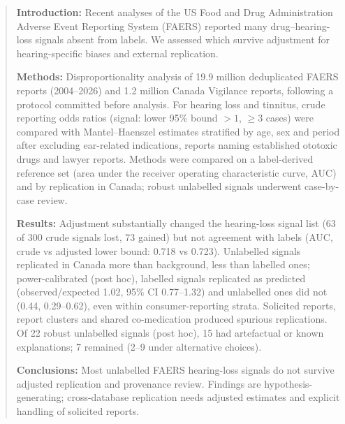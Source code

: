 \begin{abstract}
\noindent\textbf{Introduction:} Recent analyses of the US Food and Drug Administration Adverse Event
Reporting System (FAERS) reported many drug--hearing-loss signals absent from labels. We assessed which survive adjustment for
hearing-specific biases and external replication.

\noindent\textbf{Methods:} Disproportionality analysis of 19.9 million deduplicated FAERS reports
(2004--2026) and 1.2 million Canada Vigilance reports, following a protocol committed before
analysis. For hearing loss and tinnitus, crude reporting odds ratios (signal: lower 95\% bound $>1$, $\geq$3 cases) were
compared with Mantel--Haenszel estimates stratified by age, sex and period after excluding ear-related indications, reports
naming established ototoxic drugs and lawyer reports. Methods were compared on a label-derived reference set (area under the
receiver operating characteristic curve, AUC) and by replication in Canada; robust unlabelled signals underwent
case-by-case review.

\noindent\textbf{Results:} Adjustment substantially changed the hearing-loss signal list
(63 of 300 crude signals lost, 73 gained) but not agreement
with labels (AUC, crude vs adjusted lower bound: 0.718 vs
0.723). Unlabelled signals replicated in Canada more than background, less than labelled ones; power-calibrated (post hoc), labelled signals replicated as predicted (observed/expected
1.02, 95\% CI 0.77--1.32)
and unlabelled ones did not (0.44, 0.29--0.62),
even within consumer-reporting strata. Solicited reports, report clusters and shared
co-medication produced spurious replications. Of 22 robust unlabelled signals (post hoc), 15 had artefactual or known
explanations; 7 remained (2--9 under
alternative choices).

\noindent\textbf{Conclusions:} Most unlabelled FAERS hearing-loss signals do not survive adjusted replication and provenance
review. Findings are hypothesis-generating; cross-database replication needs adjusted estimates and explicit
handling of solicited reports.
\end{abstract}